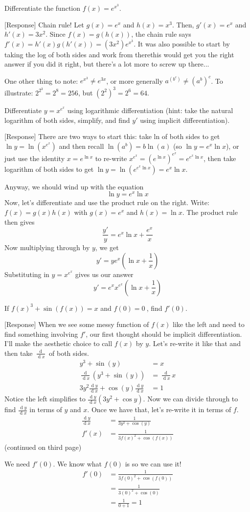 \documentclass[11pt]{exam}
\renewcommand{\d}[1]{\ensuremath{\operatorname{d}\!{#1}}}
\newcommand{\dydx}[2]{\frac{\d #1}{\d #2}}
\newcommand{\ddx}[1]{\frac{\d{}}{\d{#1}}}
\begin{document}
\begin{questions}

\addpoints
\question[2] Differentiate the function $f(x) = e^{x^3}$.

[Response]
	Chain rule! Let $g(x)=e^x$ and $h(x)=x^3$. Then, $g'(x)=e^x$ and $h'(x)=3x^2$. Since $f(x)=g(h(x))$, the chain rule says $f'(x)=h'(x)g(h'(x))=(3x^2)e^{x^3}$. It was also possible to start by taking the log of both sides and work from there\textemdash this would get you the right answer if you did it right, but there's a lot more to screw up there...
	
	One other thing to note: $e^{x^3}\neq e^{3x}$, or more generally $a^{(b^c)}\neq (a^b)^c$. To illustrate: $2^{2^3}=2^8=256$, but $(2^2)^3=2^6=64$.


\newpage
\addpoints
\question[4] Differentiate $y = x^{e^x}$ using logarithmic differentiation (hint: take the natural logarithm of both sides, simplify, and find $y'$ using implicit differentiation).

[Response] There are two ways to start this: take ln of both sides to get $\ln y=\ln(x^{e^x})$ and then recall $\ln(a^b)=b\ln(a)$ (so $\ln y=e^x\ln x$), or just use the identity $x=e^{\ln x}$ to re-write $x^{e^x}=(e^{\ln x})^{e^x}=e^{e^x\ln x}$, then take logarithm of both sides to get $\ln y=\ln (e^{e^x\ln x})=e^x\ln x$.

Anyway, we should wind up with the equation $$\ln y=e^x \ln x$$
Now, let's differentiate and use the product rule on the right. Write: $f(x)=g(x)h(x)$ with $g(x)=e^x$ and $h(x)=\ln x$. The product rule then gives
$$\frac{y'}{y}=e^x\ln x+\frac{e^x}{x}$$
Now multiplying through by $y$, we get
$$y'=ye^x(\ln x+\frac{1}{x})$$
Substituting in $y=x^{e^x}$ gives us our answer
$$y'=e^xx^{e^x}(\ln x+\frac{1}{x})$$

\addpoints
\question[4] If $f(x)^3 + \sin(f(x)) = x$ and $f(0) = 0~$, find $f'(0)$.

[Response] When we see some messy function of $f(x)$ like the left and need to find something involving $f'$, our first thought should be implicit differentiation. I'll make the aesthetic choice to call $f(x)$ by $y$. Let's re-write it like that and then take $\ddx{x}$ of both sides.
\begin{align*}
y^3+\sin (y)&=x\\
\ddx{x}(y^3+\sin (y))&=\ddx{x}x\\
3y^2\dydx{y}{x}+\cos (y)\dydx{y}{x}&=1
\end{align*}
Notice the left simplifies to $\dydx{y}{x}(3y^2+\cos y)$. Now we can divide through to find $\dydx{y}{x}$ in terms of $y$ and $x$. Once we have that, let's re-write it in terms of $f$. 
\begin{align*}
	\dydx{y}{x}&=\frac{1}{3y^2+\cos (y)}\\
	f'(x)&=\frac{1}{3f(x)^2+\cos(f(x))}
\end{align*}
(continued on third page)

We need $f'(0)$. We know what $f(0)$ is so we can use it!
\begin{align*}
f'(0)&=\frac{1}{3f(0)^2+\cos(f(0))}\\
&=\frac{1}{3(0)^2+\cos(0)}\\
&=\frac{1}{0+1}=1
\end{align*}


\end{questions}
\end{document}
